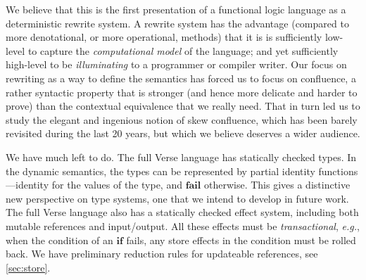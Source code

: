 \documentclass[acmsmall]{acmart}
\newcommand{\eg}{\emph{e.g.}\xspace}
\newcommand{\simon}[1]{{\color{dkblue} [{SLPJ}: #1]}}
\newcommand{\simon}[1]{}
\begin{document}
We believe that this is the first presentation of a functional logic
language as a deterministic rewrite system.  A rewrite system has the
advantage (compared to more denotational, or more operational,
methods) that it is is sufficiently low-level to capture the
\emph{computational model} of the language; and yet sufficiently
high-level to be \emph{illuminating} to a programmer or compiler
writer.  Our focus on rewriting as a way to define the
semantics has forced us to focus on confluence, a rather syntactic
property that is stronger (and hence more delicate and harder to prove) than the
contextual equivalence that we really need.  That in turn led us to
study the elegant and ingenious notion of skew confluence, which has been
barely revisited during the last 20 years, but which we believe deserves a wider
audience.




We have much left to do.  The full Verse language has
statically checked types.  In the dynamic semantics, the types can be
represented by partial identity functions---identity for the values of
the type, and \ensuremath{\textbf{fail}} otherwise.  This gives a distinctive new
perspective on type systems, one that we intend to develop in future
work.  The full Verse language also has a statically checked effect system,
including both mutable references and input/output.  All these effects
must be \emph{transactional}, {\eg}, when the condition of an \ensuremath{\textbf{if}}
fails, any store effects in the condition must be rolled back.
We have preliminary reduction rules for updateable references,
see \cref{sec:store}.
\end{document}
